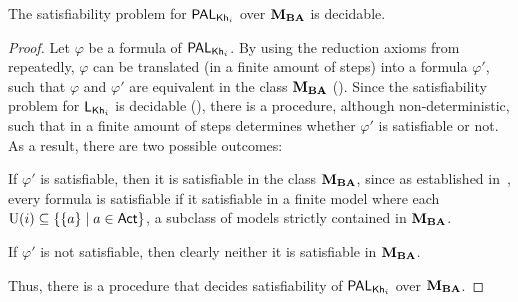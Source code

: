 \begin{corollary}\label{cor:palsat}
The satisfiability problem for $\mathsf{PAL}_{{\sf Kh}_i}$ over $\mathbf{M}_{\mathbf{BA}}$ is decidable.
\end{corollary}
\begin{proof}
Let $\varphi$ be a formula of $\mathsf{PAL}_{{\sf Kh}_i}$. By using the reduction axioms from~ repeatedly, $\varphi$ can be translated (in a finite amount of steps) into a formula $\varphi'$, such that $\varphi$ and $\varphi'$ are equivalent in the class $\mathbf{M}_{\mathbf{BA}}$ (). 
Since the satisfiability problem for $\mathsf{L}_{{\sf Kh}_i}$ is decidable (\cite{AFSVQ21,AFSVQ23report}), there is a procedure, although non-deterministic, such that in a finite amount of steps determines whether $\varphi'$ is satisfiable or not.
As a result, there are two possible outcomes:
\begin{inlineenum}
\item If $\varphi'$ is satisfiable, then it is satisfiable in the class $\mathbf{M}_{\mathbf{BA}}$, since as established in~\cite{AFSVQ21,AFSVQ23report}, every formula is satisfiable if it satisfiable in a finite model where each $\operatorname{U}(i)\subseteq\{ \{ a \} \mid a\in{\rm \sf Act} \}$, a subclass of models strictly contained in $\mathbf{M}_{\mathbf{BA}}$.  
\item If $\varphi'$ is not satisfiable, then clearly neither it is satisfiable in $\mathbf{M}_{\mathbf{BA}}$. %
\end{inlineenum}
Thus, there is a procedure that decides satisfiability of $\mathsf{PAL}_{{\sf Kh}_i}$ over $\mathbf{M}_{\mathbf{BA}}$. 
\end{proof}

